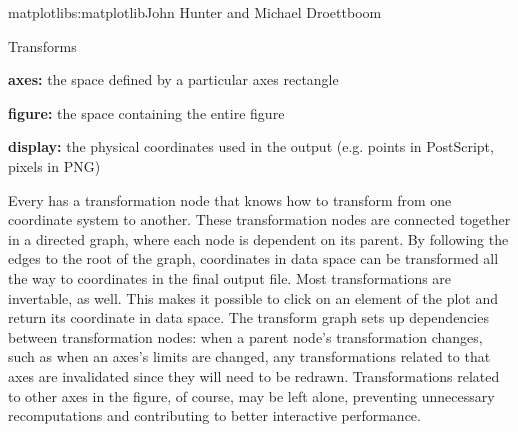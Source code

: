 \begin{aosachapter}{matplotlib}{s:matplotlib}{John Hunter and Michael Droettboom}
\begin{aosasect1}{Transforms}
\begin{aosaitemize}
\item \textbf{axes:} the space defined by a particular axes rectangle

\item \textbf{figure:} the space containing the entire figure

\item \textbf{display:} the physical coordinates used in the output
  (e.g. points in PostScript, pixels in PNG)
\end{aosaitemize}

Every  has a transformation node that knows how to
transform from one coordinate system to another.  These transformation
nodes are connected together in a directed graph, where each node is
dependent on its parent.  By following the edges to the root of the
graph, coordinates in data space can be transformed all the way to
coordinates in the final output file.  Most transformations are
invertable, as well.  This makes it possible to click on an element of
the plot and return its coordinate in data space.  The transform graph
sets up dependencies between transformation nodes: when a parent
node's transformation changes, such as when an axes's limits are
changed, any transformations related to that axes are invalidated
since they will need to be redrawn.  Transformations related to other
axes in the figure, of course, may be left alone, preventing
unnecessary recomputations and contributing to better interactive
performance.


\end{aosasect1}
\end{aosachapter}
